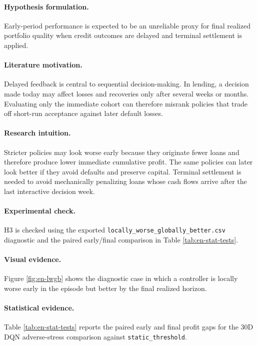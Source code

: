 \documentclass[12pt,a4paper]{article}
\begin{document}
\paragraph{Hypothesis formulation.}
Early-period performance is expected to be an unreliable proxy for final realized portfolio quality when credit outcomes are delayed and terminal settlement is applied.

\paragraph{Literature motivation.}
Delayed feedback is central to sequential decision-making. In lending, a decision made today may affect losses and recoveries only after several weeks or months. Evaluating only the immediate cohort can therefore misrank policies that trade off short-run acceptance against later default losses.

\paragraph{Research intuition.}
Stricter policies may look worse early because they originate fewer loans and therefore produce lower immediate cumulative profit. The same policies can later look better if they avoid defaults and preserve capital. Terminal settlement is needed to avoid mechanically penalizing loans whose cash flows arrive after the last interactive decision week.

\paragraph{Experimental check.}
H3 is checked using the exported \texttt{locally\_worse\_globally\_better.csv} diagnostic and the paired early/final comparison in Table \ref{tab:en-stat-tests}.

\paragraph{Visual evidence.}
Figure \ref{fig:en-lwgb} shows the diagnostic case in which a controller is locally worse early in the episode but better by the final realized horizon.

\paragraph{Statistical evidence.}
Table \ref{tab:en-stat-tests} reports the paired early and final profit gaps for the 30D DQN adverse-stress comparison against \texttt{static\_threshold}.
\end{document}
